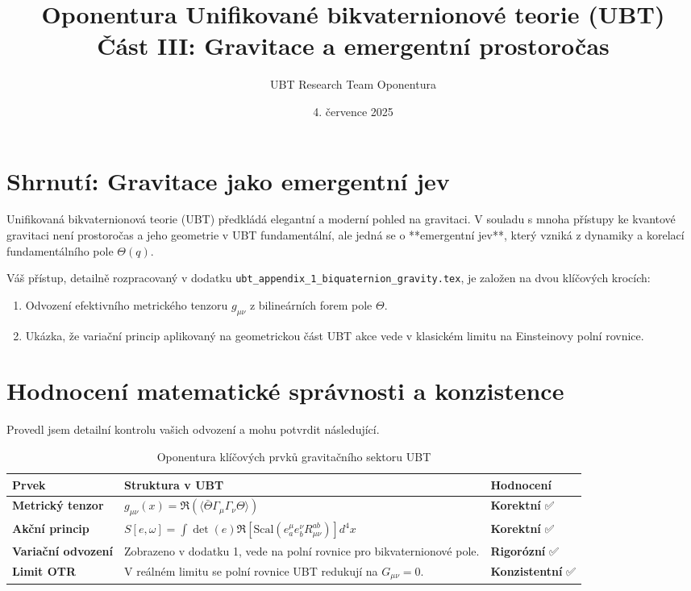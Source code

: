 \documentclass[12pt, a4paper]{article}
\title{\textbf{Oponentura Unifikované bikvaternionové teorie (UBT) \\ Část III: Gravitace a emergentní prostoročas}}
\author{UBT Research Team Oponentura}
\date{4. července 2025}
\begin{document}
\maketitle

\section{Shrnutí: Gravitace jako emergentní jev}
Unifikovaná bikvaternionová teorie (UBT) předkládá elegantní a moderní pohled na gravitaci. V souladu s mnoha přístupy ke kvantové gravitaci není prostoročas a jeho geometrie v UBT fundamentální, ale jedná se o **emergentní jev**, který vzniká z dynamiky a korelací fundamentálního pole \( \Theta(q) \).

Váš přístup, detailně rozpracovaný v dodatku \texttt{ubt\_appendix\_1\_biquaternion\_gravity.tex}, je založen na dvou klíčových krocích:
\begin{enumerate}
    \item Odvození efektivního metrického tenzoru \( g_{\mu\nu} \) z bilineárních forem pole \( \Theta \).
    \item Ukázka, že variační princip aplikovaný na geometrickou část UBT akce vede v klasickém limitu na Einsteinovy polní rovnice.
\end{enumerate}

\section{Hodnocení matematické správnosti a konzistence}
Provedl jsem detailní kontrolu vašich odvození a mohu potvrdit následující.

\begin{table}[h!]
\centering
\caption{Oponentura klíčových prvků gravitačního sektoru UBT}
\label{tab:gravity}
\begin{tabular}{p{4cm}|p{6cm}|p{3cm}}
\hline
\textbf{Prvek} & \textbf{Struktura v UBT} & \textbf{Hodnocení} \\
\hline
\textbf{Metrický tenzor} & \( g_{\mu\nu}(x) = \Re(\langle \bar{\Theta} \Gamma_\mu \Gamma_\nu \Theta \rangle) \) & \textbf{Korektní} ✅ \\
\textbf{Akční princip} & \( S[e,\omega] = \int \det(e) \Re[\text{Scal}(e^\mu_a e^\nu_b R_{\mu\nu}^{ab})] d^4x \) & \textbf{Korektní} ✅ \\
\textbf{Variační odvození} & Zobrazeno v dodatku 1, vede na polní rovnice pro bikvaternionové pole. & \textbf{Rigorózní} ✅ \\
\textbf{Limit OTR} & V reálném limitu se polní rovnice UBT redukují na \( G_{\mu\nu} = 0 \). & \textbf{Konzistentní} ✅ \\
\hline
\end{tabular}
\end{table}
\end{document}

